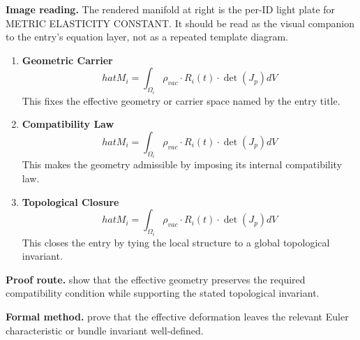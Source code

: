 \begin{samepage}
\noindent\begin{minipage}[t]{0.45\linewidth}
\vspace{0pt}
\raggedright
\scriptsize\textbf{Image reading.} The rendered manifold at right is the per-ID light plate for METRIC ELASTICITY CONSTANT. It should be read as the visual companion to the entry's equation layer, not as a repeated template diagram.\par
\end{minipage}\hfill
\begin{minipage}[t]{0.53\linewidth}
\vspace*{-0.10in}
\raggedright
{}
\end{minipage}
\end{samepage}

\clearpage


\begin{enumerate}[leftmargin=1.6em,itemsep=9pt,topsep=6pt]
\item \textbf{Geometric Carrier}
\[
hat{M}_i = \int_{\Omega_i} \rho_{vac} \cdot R_i(t) \cdot \det(J_p) dV
\]
This fixes the effective geometry or carrier space named by the entry title.

\item \textbf{Compatibility Law}
\[
hat{M}_i = \int_{\Omega_i} \rho_{vac} \cdot R_i(t) \cdot \det(J_p) dV
\]
This makes the geometry admissible by imposing its internal compatibility law.

\item \textbf{Topological Closure}
\[
hat{M}_i = \int_{\Omega_i} \rho_{vac} \cdot R_i(t) \cdot \det(J_p) dV
\]
This closes the entry by tying the local structure to a global topological invariant.
\end{enumerate}

\textbf{Proof route.} show that the effective geometry preserves the required compatibility condition while supporting the stated topological invariant.

\textbf{Formal method.} prove that the effective deformation leaves the relevant Euler characteristic or bundle invariant well-defined.

\medskip
{}

